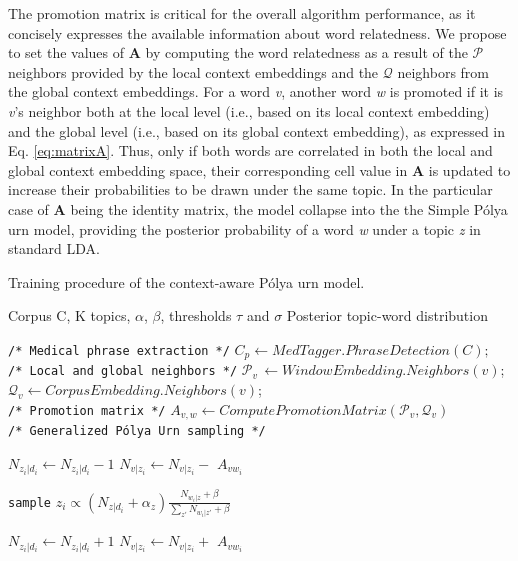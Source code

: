\documentclass[letterpaper]{article}
\begin{document}
The promotion matrix is critical for the overall algorithm performance, as it concisely expresses the available information about word relatedness. We propose to set the values of $\mathbf{A}$ by computing the word relatedness as a result of the $\mathcal{P}$ neighbors provided by the local context embeddings and the $\mathcal{Q}$ neighbors from the global context embeddings.
For a word \textit{v}, another word \textit{w} is promoted if it is \textit{v}'s neighbor both at the local level (i.e., based on its local context embedding) and the global level (i.e., based on its global context embedding), as expressed in Eq. \ref{eq:matrixA}. Thus, only if both words are correlated in both the local and global context embedding space, their corresponding cell value in $\mathbf{A}$ is updated to increase their probabilities to be drawn under the same topic.
In the particular case of $\mathbf{A}$ being the identity matrix, the model collapse into the the Simple P\'{o}lya urn model, providing the posterior probability of a word \textit{w} under a topic \textit{z} in standard LDA.

\begin{algorithm}[htb]
\begin{algorithmic}[1]
\caption{Training procedure of the context-aware P\'{o}lya urn model.}
\label{alg:polyaurn_model}
\Require Corpus C, K topics, $\alpha$, $\beta$, thresholds $\tau$ and $\sigma$
\Ensure Posterior topic-word distribution

\State \texttt{/* Medical phrase extraction */}
\State $C_p \leftarrow MedTagger.PhraseDetection(C);$ \\

\State  \texttt{/* Local and global neighbors */}
	\State $\mathcal{P}_{v}\, \leftarrow  WindowEmbedding.Neighbors(v)$;
    \State $\mathcal{Q}_{v} \leftarrow  CorpusEmbedding.Neighbors(v)$;
\EndFor \\

\State \texttt{/* Promotion matrix */}
\State $\mathit{A_{v,w}} \leftarrow ComputePromotionMatrix(\mathcal{P}_{v}, \mathcal{Q}_{v})$ \\

\State \texttt{/* Generalized P\'{o}lya Urn sampling */}

        \State $N_{z_i|d_i} \leftarrow N_{z_i|d_i} - 1 $
        	\State $N_{v|z_i} \leftarrow N_{v|z_i} -$ \textbf{\textit{$A_{vw_{i}}$}}
    	\EndFor
    \EndFor

	\State \texttt{sample} $z_i \propto (N_{z|d_i} + \alpha_z) \frac{N_{w_i|z} + \beta}{\sum_{z'}^{} N_{w_i|z'} + \beta}$

        \State $N_{z_i|d_i} \leftarrow N_{z_i|d_i} + 1 $
        	\State $N_{v|z_i} \leftarrow N_{v|z_i} +$ \textbf{\textit{$A_{vw_{i}}$}}  %
    	\EndFor
    \EndFor
\EndFor

\end{algorithmic}
\end{algorithm}
\end{document}
